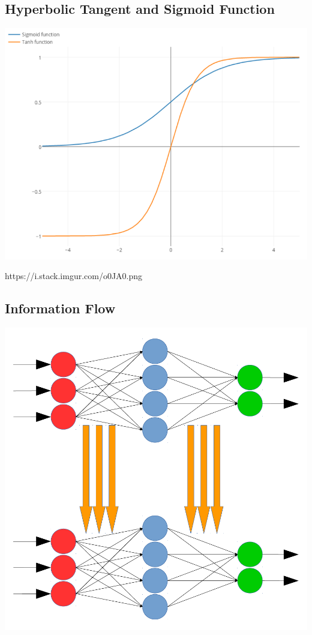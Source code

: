 \documentclass[a0,portrait,25pt]{sciposter}
\begin{document}
\begin{multicols}{3}
\begin{mdframed}[backgroundcolor=white,roundcorner=4pt,shadow=true,linewidth=1pt]
\color{Black}
\section*{Hyperbolic Tangent and Sigmoid Function}
\begin{minipage}[c]{1\linewidth}
\includegraphics[width=0.9\linewidth]{fig02}
\end{minipage}
https://i.stack.imgur.com/o0JA0.png
\end{mdframed}

\begin{mdframed}[backgroundcolor=white,roundcorner=4pt,shadow=true,linewidth=1pt]
\color{Black}
\section*{Information Flow}
\begin{minipage}[c]{1\linewidth}
\includegraphics[width=0.9\linewidth]{fig05}
\end{minipage}
\end{mdframed}


\end{multicols}
\end{document}
